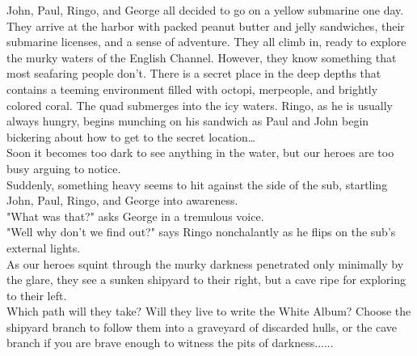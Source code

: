 \documentclass{article}
\begin{document}
John, Paul, Ringo, and George all decided to go on a yellow submarine one day.
They arrive at the harbor with packed peanut butter and jelly sandwiches,
their submarine licenses, and a sense of adventure.
They all climb in, ready to explore the murky waters of the English Channel.
However, they know something that most seafaring people don’t.
There is a secret place in the deep depths that contains a teeming environment
filled with octopi, merpeople, and brightly colored coral.
The quad submerges into the icy waters. Ringo, as he is usually always hungry,
begins munching on his sandwich as Paul and John begin bickering about how to
get to the secret location…\\

Soon it becomes too dark to see anything in the water, but our heroes are too busy arguing to notice.\\

Suddenly, something heavy seems to hit against the side of the sub, startling John, Paul, Ringo, and George into awareness.\\

"What was that?" asks George in a tremulous voice.\\

"Well why don't we find out?" says Ringo nonchalantly as he flips on the sub's external lights.\\

As our heroes squint through the murky darkness penetrated only minimally by the glare, they see a sunken shipyard to their right, but a cave ripe for exploring to their left.\\

Which path will they take? Will they live to write the White Album? Choose the shipyard branch to follow them into a graveyard of discarded hulls, or the cave branch if you are brave enough to witness the pits of darkness......\\
\end{document}
